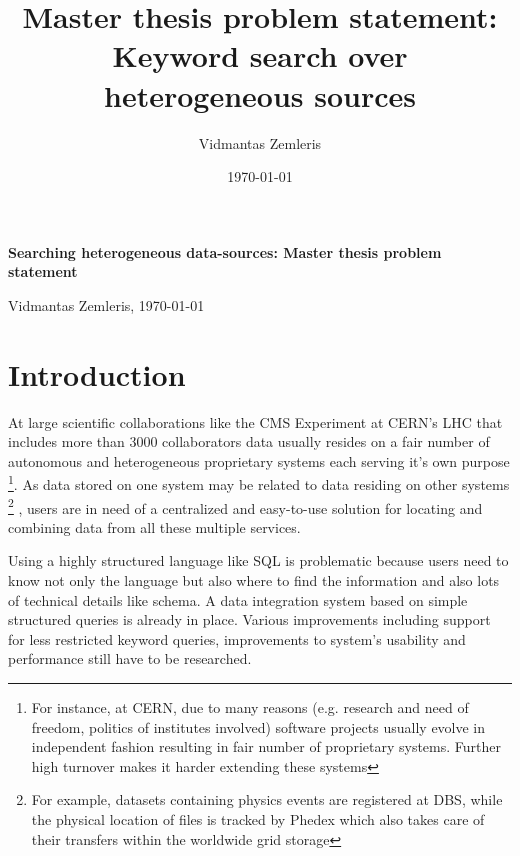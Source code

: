 \documentclass[a4paper,11pt,draft]{article}
\begin{document}
 
\title{Master thesis problem statement: Keyword search over heterogeneous sources} %
\author{Vidmantas Zemleris}  %
\date{\today}  %
 

%
 \centerline{\Large \bf Searching heterogeneous data-sources: Master thesis problem statement} %
 \medskip
 
 \centerline{Vidmantas Zemleris, \today}  %
 \medskip
 


 
\section{Introduction}
At large scientific collaborations like the CMS Experiment at CERN's LHC that includes more than 3000 collaborators data usually resides on a fair number of autonomous and heterogeneous proprietary systems each serving it's own purpose
\footnote{For instance, at CERN,  due to many reasons (e.g. research and need of freedom, politics of institutes involved) software projects usually evolve in independent fashion resulting in fair number of proprietary systems\cite{Koch00CERN}. Further high turnover makes it harder extending these systems}. As data stored on one system may be related to data residing on other systems%
	\footnote{For example, datasets containing physics events are registered at DBS, while the physical location of files is tracked by Phedex which also takes care of their transfers within the worldwide grid storage}%
, users are in need of a centralized and easy-to-use solution for locating and combining data from all these multiple services.

Using a highly structured language like SQL is problematic because users need to know not only the language but also where to find the information and also lots of technical details like schema. A data integration system based on simple structured queries is already in place. Various improvements including support for less restricted keyword queries, improvements to system's usability and performance still have to be researched.

\end{document}
